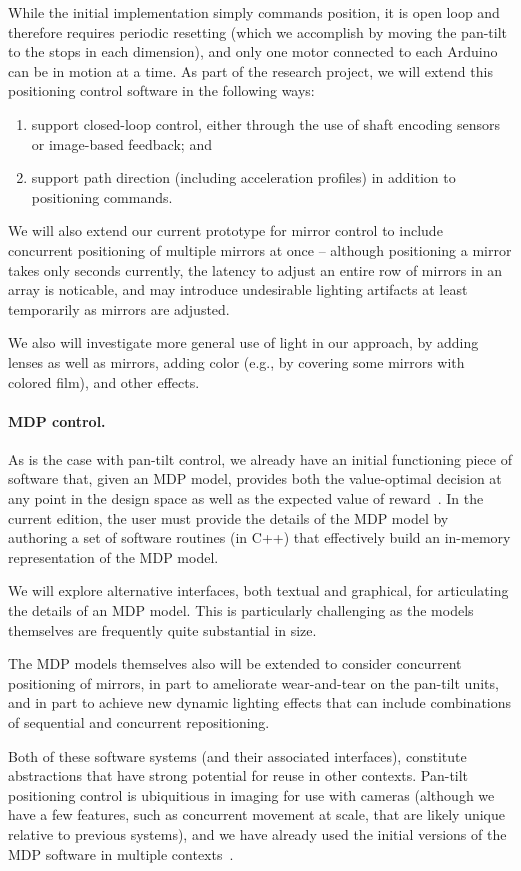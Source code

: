 While the initial implementation simply commands position, it is open loop
and therefore requires periodic resetting (which we accomplish by moving the
pan-tilt to the stops in each dimension), and only one motor 
connected to each Arduino can be in motion at a time.
As part of the research project, we will extend this positioning control
software in the following ways:
\begin{enumerate}

\item support closed-loop control, either through the use of shaft encoding
sensors or image-based feedback; and

\item support path direction (including acceleration profiles) in addition
to positioning commands.

\end{enumerate}

We will also extend our current prototype for mirror control to include concurrent positioning
of multiple mirrors at once -- although positioning a mirror takes only seconds currently,
the latency to adjust an entire row of mirrors in an array is noticable, and may introduce
undesirable lighting artifacts at least temporarily as mirrors are adjusted.



We also will investigate more general use of light in our approach, by adding
lenses as well as mirrors, adding color (e.g., by covering some mirrors with colored film),
and other effects. 

\paragraph{MDP control.}
As is the case with pan-tilt control, we already have an initial functioning
piece of software that, given an MDP model, provides both the
value-optimal decision at any point in the design space as well as
the expected value of reward~\cite{mskgct13,tggs10}.
In the current edition, the user must provide the details of the MDP model
by authoring a set of software routines (in C++) that effectively build
an in-memory representation of the MDP model.

We will explore alternative interfaces, both textual and graphical,
for articulating the details of an MDP model.  This is particularly
challenging as the models themselves are frequently quite substantial
in size.

The MDP models themselves also will be extended to consider concurrent positioning of mirrors, in
part to ameliorate wear-and-tear on the pan-tilt units, and in part to achieve new dynamic
lighting effects that can include combinations of sequential and concurrent repositioning.

Both of these software systems (and their associated interfaces), constitute
abstractions that have strong potential for reuse in other contexts.
Pan-tilt positioning control is ubiquitious in imaging for use
with cameras (although we have a few features, such as concurrent movement
at scale, that are likely unique relative to previous systems),
and we have already used the initial versions of the MDP
software in multiple contexts~\cite{mskgct13,tggs10}.
